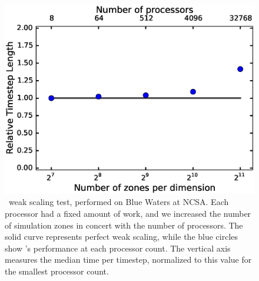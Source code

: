 \documentclass[12pt]{article}
\begin{document}
\begin{figure}
  \centering
  \includegraphics[scale=0.8]{plots/weak_scaling}
  \caption[\castro\ weak scaling test]
          {\castro\ weak scaling test, performed on Blue Waters at
           NCSA. Each processor had a fixed amount of work, and we increased the
           number of simulation zones in concert with the number of processors. The
           solid curve represents perfect weak scaling, while the blue circles show
           \castro's performance at each processor count. The vertical axis measures
           the median time per timestep, normalized to this value for the smallest
           processor count.
           \label{fig:weak_scaling}}
\end{figure}
\end{document}
